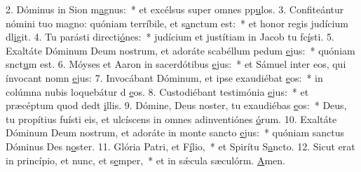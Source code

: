 2. Dóminus in Sion m\uline{a}gnus:~* et excélsus super omnes pp\uline{u}los.
3. Confiteántur nómini tuo magno: quóniam terríbile, et s\uline{a}nctum est:~* et honor regis judícium dl\uline{i}git.
4. Tu parásti directi\uline{ó}nes:~* judícium et justítiam in Jacob tu fc\uline{í}sti.
5. Exaltáte Dóminum Deum nostrum, et adoráte scabéllum pedum \uline{e}jus:~* quóniam snct\uline{u}m est.
6. Móyses et Aaron in sacerdótibus \uline{e}jus:~* et Sámuel inter eos, qui ínvocant nomn \uline{e}jus:
7. Invocábant Dóminum, et ipse exaudiébat \uline{e}os:~* in colúmna nubis loquebátur d \uline{e}os.
8. Custodiébant testimónia \uline{e}jus:~* et præcéptum quod dedt \uline{i}llis.
9. Dómine, Deus noster, tu exaudiébas \uline{e}os:~* Deus, tu propítius fuísti eis, et ulcíscens in omnes adinventiónes \uline{ó}rum.
10. Exaltáte Dóminum Deum nostrum, et adoráte in monte sancto \uline{e}jus:~* quóniam sanctus Dóminus Des n\uline{o}ster.
11. Glória Patri, et F\uline{í}lio,~* et Spirítu S\uline{a}ncto.
12. Sicut erat in princípio, et nunc, et s\uline{e}mper,~* et in sǽcula sæculórm. \uline{A}men.
